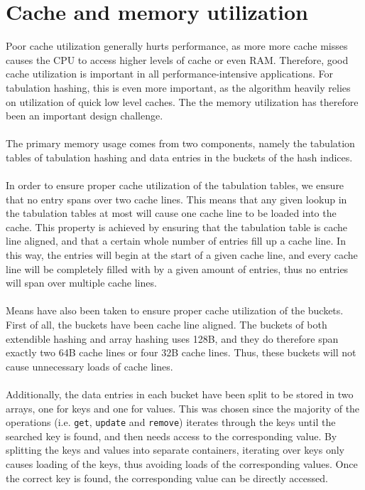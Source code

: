 \documentclass[11pt]{report} %
\begin{document}
\section{Cache and memory utilization}
\label{sec:design_cache_and_memory_utilization}
Poor cache utilization generally hurts performance, as more more cache misses causes the CPU to access higher levels of cache or even RAM. Therefore, good cache utilization is important in all performance-intensive applications. For tabulation hashing, this is even more important, as the algorithm heavily relies on utilization of quick low level caches. The the memory utilization has therefore been an important design challenge.\\
\\
The primary memory usage comes from two components, namely the tabulation tables of tabulation hashing and data entries in the buckets of the hash indices.\\
\\
In order to ensure proper cache utilization of the tabulation tables, we ensure that no entry spans over two cache lines. This means that any given lookup in the tabulation tables at most will cause one cache line to be loaded into the cache. This property is achieved by ensuring that the tabulation table is cache line aligned, and that a certain whole number of entries fill up a cache line. In this way, the entries will begin at the start of a given cache line, and every cache line will be completely filled with by a given amount of entries, thus no entries will span over multiple cache lines. \\
\\
Means have also been taken to ensure proper cache utilization of the buckets. First of all, the buckets have been cache line aligned. The buckets of both extendible hashing and array hashing uses 128B, and they do therefore span exactly two 64B cache lines or four 32B cache lines. Thus, these buckets will not cause unnecessary loads of cache lines. \\
\\
Additionally, the data entries in each bucket have been split to be stored in two arrays, one for keys and one for values. This was chosen since the majority of the operations (i.e. \verb|get|, \verb|update| and \verb|remove|) iterates through the keys until the searched key is found, and then needs access to the corresponding value. By splitting the keys and values into separate containers, iterating over keys only causes loading of the keys, thus avoiding loads of the corresponding values. Once the correct key is found, the corresponding value can be directly accessed.
\end{document}
